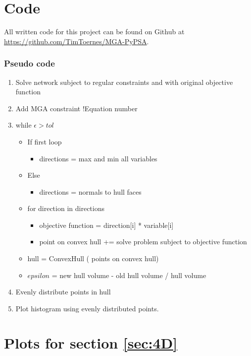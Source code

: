 

\chapter{Code}


All written code for this project can be found on Github at \url{https://github.com/TimToernes/MGA-PyPSA}. 


\subsection{Pseudo code}

\begin{enumerate}[label={}]
\item Solve network subject to regular constraints and with original objective function
\item Add MGA constraint !Equation number
\item while $\epsilon>tol$
\begin{itemize}[label={}]
\item If first loop
\begin{itemize}[label={}]
\item directions = max and min all variables
\end{itemize}
\item Else
\begin{itemize}[label={}]
\item directions = normals to hull faces
\end{itemize}
\item for direction in directions
\begin{itemize}[label={}]
\item objective function = direction[i] * variable[i]
\item point on convex hull += solve problem subject to objective function
\end{itemize}
\item hull = ConvexHull ( points on convex hull)
\item $epsilon$ = new hull volume - old hull volume / hull volume
\end{itemize}
\item Evenly distribute points in hull 
\item Plot histogram using evenly distributed points. 
\end{enumerate}




\chapter{Plots for section \ref{sec:4D} }


